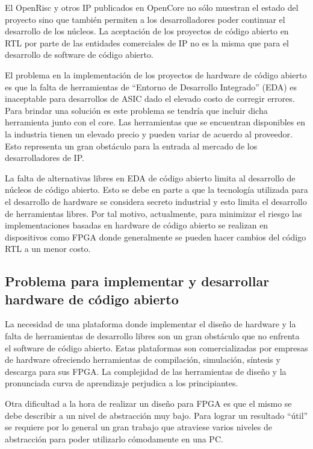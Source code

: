 El OpenRisc y otros IP publicados en OpenCore no sólo muestran el
estado del proyecto sino que también permiten a los desarrolladores
poder continuar el desarrollo de los núcleos. La aceptación de los
proyectos de código abierto en RTL por parte de las entidades
comerciales de IP no es la misma que para el desarrollo de software de
código abierto.

El problema en la implementación de los proyectos de hardware de
código abierto es que la falta de herramientas de ``Entorno de
Desarrollo Integrado'' (EDA) es inaceptable para desarrollos de ASIC
dado el elevado costo de corregir errores. Para brindar una solución
es este problema se tendría que incluir dicha herramienta junto con el
core. Las herramientas que se encuentran disponibles en la industria
tienen un elevado precio y pueden variar de acuerdo al proveedor. Esto
representa un gran obstáculo para la entrada al mercado de los
desarrolladores de IP.

La falta de alternativas libres en EDA de código abierto limita al
desarrollo de núcleos de código abierto. Esto se debe en parte a que
la tecnología utilizada para el desarrollo de hardware se considera
secreto industrial y esto limita el desarrollo de herramientas
libres. Por tal motivo, actualmente, para minimizar el riesgo las
implementaciones basadas en hardware de código abierto se realizan en
dispositivos como FPGA donde generalmente se pueden hacer cambios del
código RTL a un menor costo.


\subsection{Problema para implementar y desarrollar hardware de código abierto}

La necesidad de una plataforma donde implementar el diseño de hardware
y la falta de herramientas de desarrollo libres son un gran obstáculo
que no enfrenta el software de código abierto. Estas plataformas son
comercializadas por empresas de hardware ofreciendo herramientas de
compilación, simulación, síntesis y descarga para sus FPGA. La
complejidad de las herramientas de diseño y la pronunciada curva de
aprendizaje perjudica a los principiantes.

Otra dificultad a la hora de realizar un diseño para FPGA es que el
mismo se debe describir a un nivel de abstracción muy bajo. Para
lograr un resultado ``útil'' se requiere por lo general un gran
trabajo que atraviese varios niveles de abstracción para poder
utilizarlo cómodamente en una PC.

